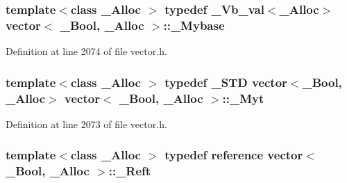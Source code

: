\hypertarget{classvector_3_01___bool_00_01___alloc_01_4_a90abb38ec959ec3cdec7a70765171609}{
\subsubsection[{\+\_\+\+Mybase}]{\setlength{\rightskip}{0pt plus 5cm}template$<$class \+\_\+\+Alloc $>$ typedef {\bf \+\_\+\+Vb\+\_\+val}$<$\+\_\+\+Alloc$>$ {\bf vector}$<$ \+\_\+\+Bool, \+\_\+\+Alloc $>$\+::{\bf \+\_\+\+Mybase}}}\label{classvector_3_01___bool_00_01___alloc_01_4_a90abb38ec959ec3cdec7a70765171609}


Definition at line 2074 of file vector.\+h.

\hypertarget{classvector_3_01___bool_00_01___alloc_01_4_ada353b682f03c458260a7f7cf361d465}{
\subsubsection[{\+\_\+\+Myt}]{\setlength{\rightskip}{0pt plus 5cm}template$<$class \+\_\+\+Alloc $>$ typedef \+\_\+\+S\+T\+D {\bf vector}$<$\+\_\+\+Bool, \+\_\+\+Alloc$>$ {\bf vector}$<$ \+\_\+\+Bool, \+\_\+\+Alloc $>$\+::{\bf \+\_\+\+Myt}}}\label{classvector_3_01___bool_00_01___alloc_01_4_ada353b682f03c458260a7f7cf361d465}


Definition at line 2073 of file vector.\+h.

\hypertarget{classvector_3_01___bool_00_01___alloc_01_4_a22d06114ab3f5ef9677e423f41d99846}{
\subsubsection[{\+\_\+\+Reft}]{\setlength{\rightskip}{0pt plus 5cm}template$<$class \+\_\+\+Alloc $>$ typedef {\bf reference} {\bf vector}$<$ \+\_\+\+Bool, \+\_\+\+Alloc $>$\+::{\bf \+\_\+\+Reft}}}\label{classvector_3_01___bool_00_01___alloc_01_4_a22d06114ab3f5ef9677e423f41d99846}


